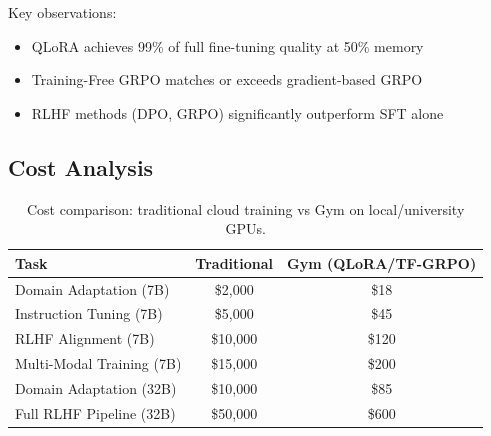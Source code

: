 Key observations:
\begin{itemize}
\item QLoRA achieves 99\% of full fine-tuning quality at 50\% memory
\item Training-Free GRPO matches or exceeds gradient-based GRPO
\item RLHF methods (DPO, GRPO) significantly outperform SFT alone
\end{itemize}

\subsection{Cost Analysis}

\begin{table}[h]
\centering
\begin{tabular}{lcc}
\toprule
Task & Traditional & Gym (QLoRA/TF-GRPO) \\
\midrule
Domain Adaptation (7B) & \$2,000 & \$18 \\
Instruction Tuning (7B) & \$5,000 & \$45 \\
RLHF Alignment (7B) & \$10,000 & \$120 \\
Multi-Modal Training (7B) & \$15,000 & \$200 \\
\midrule
Domain Adaptation (32B) & \$10,000 & \$85 \\
Full RLHF Pipeline (32B) & \$50,000 & \$600 \\
\bottomrule
\end{tabular}
\caption{Cost comparison: traditional cloud training vs Gym on local/university GPUs.}
\end{table}

